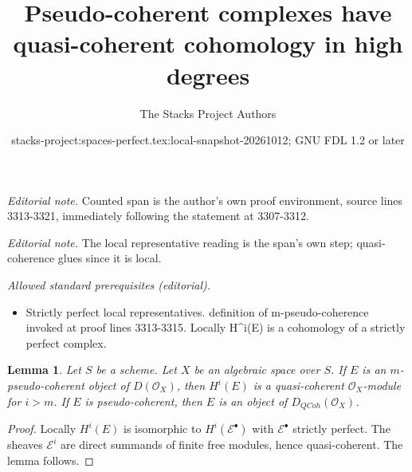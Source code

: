 \documentclass{stacks-project}
\title{Pseudo-coherent complexes have quasi-coherent cohomology in high degrees}
\author{The Stacks Project Authors}
\date{stacks-project:spaces-perfect.tex:local-snapshot-20261012; GNU FDL 1.2 or later}
\theoremstyle{plain}
\newtheorem{lemma}[subsection]{Lemma}
\theoremstyle{definition}
\theoremstyle{remark}
\numberwithin{equation}{subsection}
\def\QCoh{\mathit{QCoh}}
\begin{document}
\maketitle
\noindent\textit{Editorial note.} Counted span is the author's own proof environment, source lines 3313-3321, immediately following the statement at 3307-3312.\par\medskip
\noindent\textit{Editorial note.} The local representative reading is the span's own step; quasi-coherence glues since it is local.\par\medskip
\noindent\textit{Allowed standard prerequisites (editorial).}\begin{itemize}
\item Strictly perfect local representatives. definition of m-pseudo-coherence invoked at proof lines 3313-3315. Locally H\textasciicircum{}i(E) is a cohomology of a strictly perfect complex.
\end{itemize}\medskip
\begin{lemma}
\label{lemma-pseudo-coherent}
Let $S$ be a scheme. Let $X$ be an algebraic space over $S$.
If $E$ is an $m$-pseudo-coherent object of $D(\mathcal{O}_X)$,
then $H^i(E)$ is a quasi-coherent $\mathcal{O}_X$-module for $i > m$.
If $E$ is pseudo-coherent, then $E$ is an object of
$D_\QCoh(\mathcal{O}_X)$.
\end{lemma}

\begin{proof}
Locally $H^i(E)$ is isomorphic to $H^i(\mathcal{E}^\bullet)$
with $\mathcal{E}^\bullet$ strictly perfect. The sheaves
$\mathcal{E}^i$ are direct summands of finite free modules,
hence quasi-coherent. The lemma follows.
\end{proof}
\end{document}
